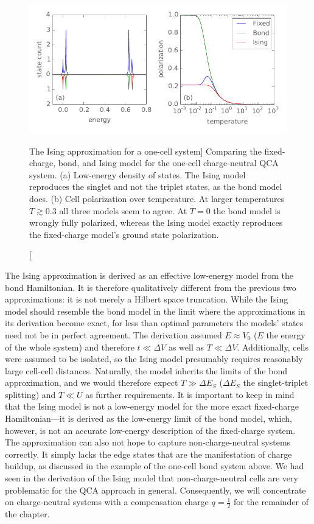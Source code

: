 %
\begin{figure}
  \center
  \includegraphics{ising_approximation1}
  \caption
  [The Ising approximation for a one-cell system]
  {
  Comparing the fixed-charge, bond, and Ising model for the one-cell
  charge-neutral QCA system. (a) Low-energy density of states. The Ising model
  reproduces the singlet and not the triplet states, as the bond model does. (b)
  Cell polarization over temperature. At larger temperatures $T \gtrsim 0.3$ all
  three models seem to agree. At $T = 0$ the bond model is wrongly fully
  polarized, whereas the Ising model exactly reproduces the fixed-charge model's
  ground state polarization.
  }
  \label{fig:ising_approximation1}
\end{figure}
%
The Ising approximation is derived as an effective low-energy model from the
bond Hamiltonian. It is therefore qualitatively different from the previous two
approximations: it is not merely a Hilbert space truncation. While the Ising
model should resemble the bond model in the limit where the approximations in
its derivation become exact, for less than optimal parameters the models' states
need not be in perfect agreement. The derivation assumed $E \approx V_0$ ($E$
the energy of the whole system) and therefore $t \ll \Delta V$ as well as $T \ll
\Delta V$. Additionally, cells were assumed to be isolated, so the Ising model
presumably requires reasonably large cell-cell distances. Naturally, the model
inherits the limits of the bond approximation, and we would therefore expect $T
\gg \Delta E_S$ ($\Delta E_S$ the singlet-triplet splitting) and $T \ll U$ as
further requirements. It is important to keep in mind that the Ising model is
not a low-energy model for the more exact fixed-charge Hamiltonian---it is
derived as the low-energy limit of the bond model, which, however, is not an
accurate low-energy description of the fixed-charge system. The approximation
can also not hope to capture non-charge-neutral systems correctly. It simply
lacks the edge states that are the manifestation of charge buildup, as discussed
in the example of the one-cell bond system above. We had seen in the derivation
of the Ising model that non-charge-neutral cells are very problematic for the
QCA approach in general. Consequently, we will concentrate on charge-neutral
systems with a compensation charge $q = \frac{1}{2}$ for the remainder of the
chapter.


